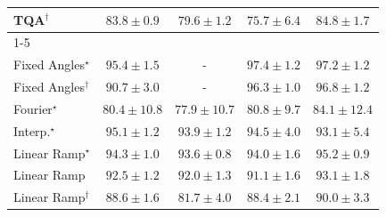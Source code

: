 \begin{tabular}{l|cccc|}
TQA$^\dagger$ & {\cellcolor[HTML]{2F944E}} \color[HTML]{F1F1F1} $83.8\pm 0.9$ & {\cellcolor[HTML]{4AB062}} \color[HTML]{F1F1F1} $79.6\pm 1.2$ & {\cellcolor[HTML]{70C275}} \color[HTML]{000000} $75.7\pm 6.4$ & {\cellcolor[HTML]{2A8D49}} \color[HTML]{F1F1F1} $84.8\pm 1.7$ \\
\cline{1-5}
\multicolumn{5}{c}{\rule{0pt}{8pt}SV} \\
\midrule
Fixed Angles$^\star$ & {\cellcolor[HTML]{03446A}} \color[HTML]{F1F1F1} $95.4\pm 1.5$ & {\cellcolor[HTML]{000000}} \color[HTML]{F1F1F1} {\cellcolor{white}} \color{black} - & {\cellcolor[HTML]{023858}} \color[HTML]{F1F1F1} $97.4\pm 1.2$ & {\cellcolor[HTML]{02395A}} \color[HTML]{F1F1F1} $97.2\pm 1.2$ \\
Fixed Angles$^\dagger$ & {\cellcolor[HTML]{045E94}} \color[HTML]{F1F1F1} $90.7\pm 3.0$ & {\cellcolor[HTML]{000000}} \color[HTML]{F1F1F1} {\cellcolor{white}} \color{black} - & {\cellcolor[HTML]{023E62}} \color[HTML]{F1F1F1} $96.3\pm 1.0$ & {\cellcolor[HTML]{023B5D}} \color[HTML]{F1F1F1} $96.8\pm 1.2$ \\
Fourier$^\star$ & {\cellcolor[HTML]{3790C0}} \color[HTML]{F1F1F1} $80.4\pm 10.8$ & {\cellcolor[HTML]{529BC7}} \color[HTML]{F1F1F1} $77.9\pm 10.7$ & {\cellcolor[HTML]{348EBF}} \color[HTML]{F1F1F1} $80.8\pm 9.7$ & {\cellcolor[HTML]{167BB6}} \color[HTML]{F1F1F1} $84.1\pm 12.4$ \\
Interp.$^\star$ & {\cellcolor[HTML]{03466E}} \color[HTML]{F1F1F1} $95.1\pm 1.2$ & {\cellcolor[HTML]{034C78}} \color[HTML]{F1F1F1} $93.9\pm 1.2$ & {\cellcolor[HTML]{034973}} \color[HTML]{F1F1F1} $94.5\pm 4.0$ & {\cellcolor[HTML]{045280}} \color[HTML]{F1F1F1} $93.1\pm 5.4$ \\
Linear Ramp$^\star$ & {\cellcolor[HTML]{034A74}} \color[HTML]{F1F1F1} $94.3\pm 1.0$ & {\cellcolor[HTML]{034E7B}} \color[HTML]{F1F1F1} $93.6\pm 0.8$ & {\cellcolor[HTML]{034C78}} \color[HTML]{F1F1F1} $94.0\pm 1.6$ & {\cellcolor[HTML]{03456C}} \color[HTML]{F1F1F1} $95.2\pm 0.9$ \\
Linear Ramp & {\cellcolor[HTML]{045585}} \color[HTML]{F1F1F1} $92.5\pm 1.2$ & {\cellcolor[HTML]{04588A}} \color[HTML]{F1F1F1} $92.0\pm 1.3$ & {\cellcolor[HTML]{045C90}} \color[HTML]{F1F1F1} $91.1\pm 1.6$ & {\cellcolor[HTML]{045280}} \color[HTML]{F1F1F1} $93.1\pm 1.8$ \\
Linear Ramp$^\dagger$ & {\cellcolor[HTML]{0566A0}} \color[HTML]{F1F1F1} $88.6\pm 1.6$ & {\cellcolor[HTML]{2C89BD}} \color[HTML]{F1F1F1} $81.7\pm 4.0$ & {\cellcolor[HTML]{0567A2}} \color[HTML]{F1F1F1} $88.4\pm 2.1$ & {\cellcolor[HTML]{046198}} \color[HTML]{F1F1F1} $90.0\pm 3.3$ \\

\end{tabular}
